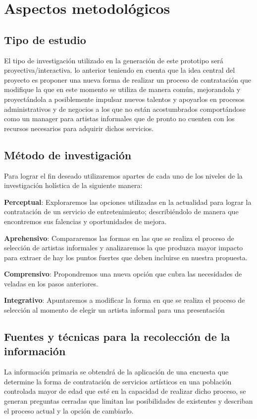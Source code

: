 \section{Aspectos metodológicos}
\subsection{Tipo de estudio}
El tipo de investigación utilizado en la generación de este prototipo será proyectiva/interactiva\cite{holistica}. lo anterior teniendo en cuenta que la idea central del proyecto es proponer una nueva forma de realizar un proceso de contratación que modifique la que en este momento se utiliza de manera común, mejorandola y proyectándola a posiblemente impulsar nuevos talentos y apoyarlos en procesos administrativos y de negocios a los que no están acostumbrados comportándose como un manager para artistas informales que de pronto no cuenten con los recursos necesarios para adquirir dichos servicios.
\subsection{Método de investigación}
Para lograr el fin deseado utilizaremos apartes de cada uno de los niveles de la investigación holística de la siguiente manera:

\textbf{Perceptual}: Exploraremos las opciones utilizadas en la actualidad para lograr la contratación de un servicio de entretenimiento; describiéndolo de manera que encontremos sus falencias y oportunidades de mejora.

\textbf{Aprehensivo}: Compararemos las formas en las que se realiza el proceso de selección de artistas informales y analizaremos la que produzca mayor impacto para extraer de hay los puntos fuertes que deben incluirse en nuestra propuesta.

\textbf{Comprensivo}: Propondremos una nueva opción que cubra las necesidades de veladas en los pasos anteriores.

\textbf{Integrativo}: Apuntaremos a modificar la forma en que se realiza el proceso de selección al momento de elegir un artista informal para una presentación  

\subsection{Fuentes y técnicas para la recolección de la información}
La información primaria se obtendrá de la aplicación de una encuesta que determine la forma de contratación de servicios artísticos en una población controlada mayor de edad que esté en la capacidad de realizar dicho proceso, se generan preguntas cerradas que limitan las posibilidades de existentes y describan el proceso actual y la opción de cambiarlo.\\

